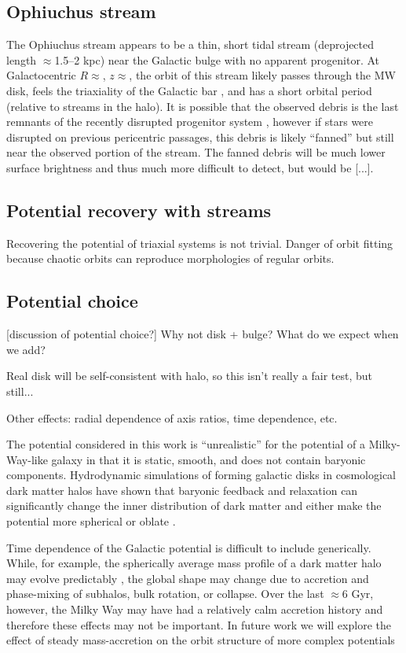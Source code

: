 \documentclass[letterpaper,12pt,preprint]{aastex}
\begin{document}
\subsection{Ophiuchus stream}

The Ophiuchus stream \citep{bernard14, sesar15} appears to be a thin, short tidal stream (deprojected length $\approx$1.5--2 kpc) near the Galactic bulge with no apparent progenitor. At Galactocentric $R \approx $, $z \approx $, the orbit of this stream likely passes through the MW disk, feels the triaxiality of the Galactic bar \citep[e.g.,][]{wegg13, wegg15}, and has a short orbital period (relative to streams in the halo). It is possible that the observed debris is the last remnants of the recently disrupted progenitor system \citep{sesar15}, however if stars were disrupted on previous pericentric passages, this debris is likely ``fanned'' but still near the observed portion of the stream. The fanned debris will be much lower surface brightness and thus much more difficult to detect, but would be [...].

\subsection{Potential recovery with streams}

Recovering the potential of triaxial systems is not trivial. Danger of orbit fitting because chaotic orbits can reproduce morphologies of regular orbits.

\subsection{Potential choice}
[discussion of potential choice?]
Why not disk + bulge? What do we expect when we add?

Real disk will be self-consistent with halo, so this isn't really a fair test, but still...

Other effects: radial dependence of axis ratios, time dependence, etc.

The potential considered in this work is ``unrealistic'' for the potential of a Milky-Way-like galaxy in that it is static, smooth, and does not contain baryonic components. Hydrodynamic simulations of forming galactic disks in cosmological dark matter halos have shown that baryonic feedback and relaxation can significantly change the inner distribution of dark matter and either make the potential more spherical or oblate \citep{many}. 

Time dependence of the Galactic potential is difficult to include generically. While, for example, the spherically average mass profile of a dark matter halo may evolve predictably \citep[in cosmological simulations;][]{wechsler02, buist14}, the global shape may change due to accretion and phase-mixing of subhalos, bulk rotation, or collapse. Over the last $\approx$6 Gyr, however, the Milky Way may have had a relatively calm accretion history and therefore these effects may not be important. In future work we will explore the effect of steady mass-accretion on the orbit structure of more complex potentials
\end{document}
